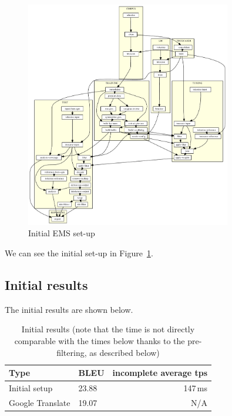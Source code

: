 \begin{figure}[h]
\begin{center}
\includegraphics[width=0.8\textwidth]{figures/moses_13_graf.pdf}
\end{center}
\caption{Initial EMS set-up}\label{moses:initial}
\end{figure}

We can see the initial set-up in Figure~\ref{moses:initial}.
\subsection{Initial results}

The initial results are shown below.

\begin{table}[h]
\begin{center}
\begin{tabular}{|l|l|r|}
    \hline
    \textbf{Type} & \textbf{BLEU} & \textbf{incomplete average tps} \\ \hline
    Initial setup & 23.88 & 147\,ms \\ \hline
    Google Translate & 19.07 & N/A \\  \hline
\end{tabular}
\end{center}

\caption{Initial results (note that the time is not directly comparable with the times below thanks to the pre-filtering, as described below)}\label{moses:initialresults}
\end{table}

